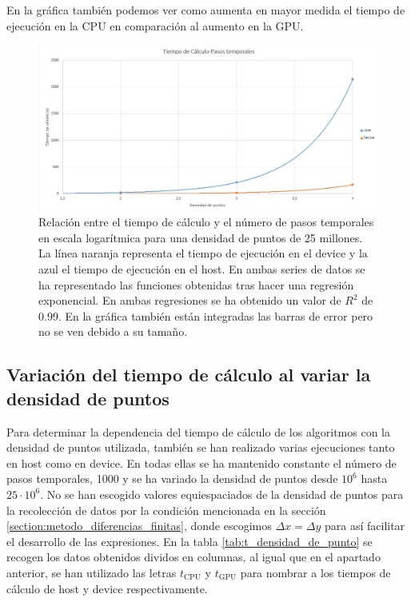 \documentclass[11pt,a4paper,twoside,pdf]{article}
\numberwithin{equation}{section}
\begin{document}
En la gráfica también podemos ver como aumenta en mayor medida el tiempo de ejecución en la CPU en comparación al aumento en la GPU.




\begin{figure}[h]
\centering
\includegraphics[width=15 cm]{T-Pasos_temporales.jpg}				
\caption{Relación entre el tiempo de cálculo y el número de pasos temporales en escala logarítmica para una densidad de puntos de 25 millones. La línea naranja representa el tiempo de ejecución en el device y la azul el tiempo de ejecución en el host. En ambas series de datos se ha representado las funciones obtenidas tras hacer una regresión exponencial. En ambas regresiones se ha obtenido un valor de $R^2$ de 0.99. En la gráfica también están integradas las barras de error pero no se ven debido a su tamaño.}
\label{fig:t-pasos_temporales}
\end{figure}
\noindent






\subsection{Variación del tiempo de cálculo al variar la densidad de puntos} \label{subsection: Variacion densidad de puntos}

Para determinar la dependencia del tiempo  de cálculo de los algoritmos con la densidad de puntos utilizada, también se han realizado varias ejecuciones tanto en host como en device. En todas ellas se ha mantenido constante el número de pasos temporales, 1000 y se ha variado la densidad de puntos desde $10^6$ hasta $25\cdot 10^6$. No se han escogido valores equiespaciados de la densidad de puntos para la recolección de datos por la condición mencionada en la sección \ref{section:metodo_diferencias_finitas}, donde escogimos $\Delta x=\Delta y$ para así facilitar el desarrollo de las expresiones. En la tabla \ref{tab:t_densidad_de_punto} se recogen los datos obtenidos dividos en columnas, al igual que en el apartado anterior, se han utilizado las letras  $t_\text{CPU}$ y  $t_\text{GPU}$ para nombrar a los tiempos de cálculo de host y device respectivamente. 
\end{document}
